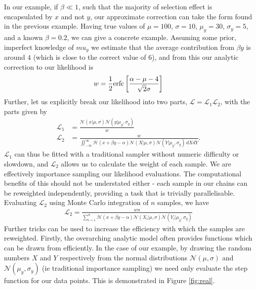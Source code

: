 \documentclass[a4paper,fleqn,usenatbib]{mnras}
\begin{document}
In our example, if $\beta \ll 1$, such that the majority of selection effect is encapsulated by $x$ and not $y$, our approximate correction can take the form found in the previous example. Having true values of $\mu = 100$, $\sigma = 10$, $\mu_y = 30$, $\sigma_y = 5$, and a known $\beta = 0.2$, we can give a concrete example. Assuming some prior, imperfect knowledge of $mu_y$  we estimate that the average contribution from $\beta y$ is around $4$ (which is close to the correct value of $6$), and from this our analytic correction to our likelihood is
\begin{align}
w = \frac{1}{2} {\rm erfc}\left[ \frac{\alpha - \mu - 4}{\sqrt{2}\sigma} \right]
\end{align}
Further, let us explicitly break our likelihood into two parts, $\mathcal{L} = \mathcal{L}_1 \mathcal{L}_2$, with the parts given by
\begin{align}
\mathcal{L}_1 &= \frac{ \mathcal{N}(x|\mu, \sigma) \mathcal{N}(y|\mu_y, \sigma_y)}{w} \\
\mathcal{L}_2 &= \frac{ w }{\iint_{-\infty}^\infty \mathcal{H}(x + \beta y - \alpha) \mathcal{N}(X|\mu, \sigma) \mathcal{N}(Y|\mu_y, \sigma_y)\, dX dY}.
\end{align}
$\mathcal{L}_1$ can thus be fitted with a traditional sampler without numeric difficulty or slowdown, and $\mathcal{L}_2$ allows us to calculate the weight of each sample. We are effectively importance sampling our likelihood evaluations. The computational benefits of this should not be understated either - each sample in our chains can be reweighted independently, providing a task that is trivially parallelisable. Evaluating $\mathcal{L}_2$ using Monte Carlo integration of $n$ samples, we have
\begin{align}
\mathcal{L}_2 = \frac{ w n }{\sum_{i=1}^{n} \mathcal{H}(x + \beta y - \alpha) \mathcal{N}(X_i|\mu, \sigma) \mathcal{N}(Y_i|\mu_y, \sigma_y)}
\end{align}
Further tricks can be used to increase the efficiency with which the samples are reweighted. Firstly, the overarching analytic model often provides functions which can be drawn from efficiently. In the case of our example, by drawing the random numbers $X$ and $Y$ respectively from the normal distributions $\mathcal{N}(\mu,\sigma)$ and $\mathcal{N}(\mu_y,\sigma_y)$ (ie traditional importance sampling) we need only evaluate the step function for our data points. This is demonstrated in Figure \ref{fig:real}.
\end{document}
